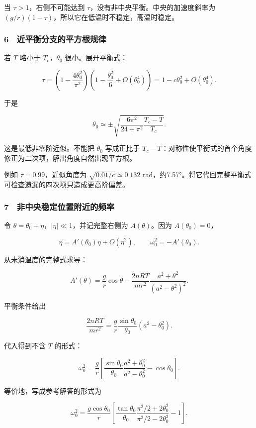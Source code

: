 \documentclass[12pt,a4paper,fontset=fandol]{ctexart}
\begin{document}
当 \(\tau>1\)，右侧不可能达到
\(\tau\)，没有非中央平衡。中央的加速度斜率为
\((g/r)(1-\tau)\)，所以它在低温时不稳定，高温时稳定。

\subsubsection{6　近平衡分支的平方根规律}\label{ux8fd1ux5e73ux8861ux5206ux652fux7684ux5e73ux65b9ux6839ux89c4ux5f8b}

若 \(T\) 略小于 \(T_c\)，\(\theta_0\) 很小。展开平衡式：

\[\tau=\left(1-\frac{4\theta_0^2}{\pi^2}\right)
\left(1-\frac{\theta_0^2}{6}+O(\theta_0^4)\right)
=1-c\theta_0^2+O(\theta_0^4).\]

于是

\[\boxed{\theta_0\simeq\pm
\sqrt{\frac{6\pi^2}{24+\pi^2}\frac{T_c-T}{T_c}}.}\]

这是最低非零阶近似。不能把 \(\theta_0\) 写成正比于
\(T_c-T\)：对称性使平衡式的首个角度修正为二次项，解出角度自然出现平方根。

例如 \(\tau=0.99\)，近似角度为 \(\sqrt{0.01/c}\simeq0.132\)
rad，约7.57°。将它代回完整平衡式可检查遗漏的四次项只造成更高阶偏差。

\subsubsection{7　非中央稳定位置附近的频率}\label{ux975eux4e2dux592eux7a33ux5b9aux4f4dux7f6eux9644ux8fd1ux7684ux9891ux7387}

令 \(\theta=\theta_0+\eta\)，\(|\eta|\ll1\)，并记完整右侧为
\(A(\theta)\)。因为 \(A(\theta_0)=0\)，

\[\ddot\eta=A'(\theta_0)\eta+O(\eta^2),\qquad
\omega_0^2=-A'(\theta_0).\]

从未消温度的完整式求导：

\[A'(\theta)=\frac gr\cos\theta
-\frac{2nRT}{mr^2}\frac{a^2+\theta^2}{(a^2-\theta^2)^2}.\]

平衡条件给出

\[\frac{2nRT}{mr^2}
=\frac gr\frac{\sin\theta_0}{\theta_0}(a^2-\theta_0^2).\]

代入得到不含 \(T\) 的形式：

\[\boxed{\omega_0^2=\frac gr
\left[\frac{\sin\theta_0}{\theta_0}
\frac{a^2+\theta_0^2}{a^2-\theta_0^2}-\cos\theta_0\right].}\]

等价地，写成参考解答的形式为

\[\omega_0^2=\frac{g\cos\theta_0}{r}
\left[\frac{\tan\theta_0}{\theta_0}
\frac{\pi^2/2+2\theta_0^2}{\pi^2/2-2\theta_0^2}-1\right].\]
\end{document}
